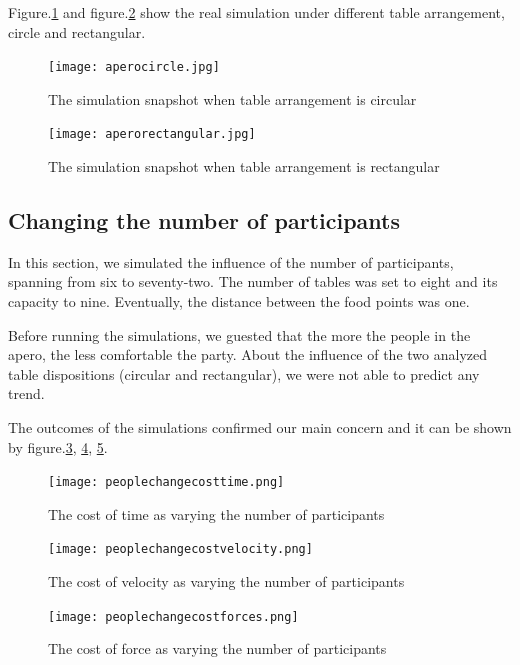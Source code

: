 \documentclass[11pt]{article}
\begin{document}
Figure.\ref{fig:aperocircle} and figure.\ref{fig:aperorectangular} show the real simulation under different table arrangement, circle and rectangular.
\begin{figure}[H]
    \centering
    \texttt{[image: aperocircle.jpg]}
    \caption{The simulation snapshot when table arrangement is circular}
    \label{fig:aperocircle}
\end{figure}

\begin{figure}[H]
    \centering
    \texttt{[image: aperorectangular.jpg]}
    \caption{The simulation snapshot when table arrangement is rectangular}
    \label{fig:aperorectangular}
\end{figure}



\subsection{Changing the number of participants}
In this section, we simulated the influence of the number of participants, spanning from six to seventy-two. The number of tables was set to eight and its capacity to nine. Eventually, the distance between the food points was one.

Before running the simulations, we guested that the more the people in the apero, the less comfortable the party. About the influence of the two analyzed table dispositions (circular and rectangular), we were not able to predict any trend.

The outcomes of the simulations confirmed our main concern and it can be shown by figure.\ref{fig:peoplecostt}, \ref{fig:peoplecostv}, \ref{fig:peoplecostf}.

\begin{figure}[ht!]
\centering
\texttt{[image: peoplechangecosttime.png]}
\caption{The cost of time as varying the number of participants}
\label{fig:peoplecostt}
\end{figure}

\begin{figure}[ht!]
\centering
\texttt{[image: peoplechangecostvelocity.png]}
\caption{The cost of velocity as varying the number of participants}
\label{fig:peoplecostv}
\end{figure}

\begin{figure}[ht!]
\centering
\texttt{[image: peoplechangecostforces.png]}
\caption{The cost of force as varying the number of participants}
\label{fig:peoplecostf}
\end{figure}
\end{document}
